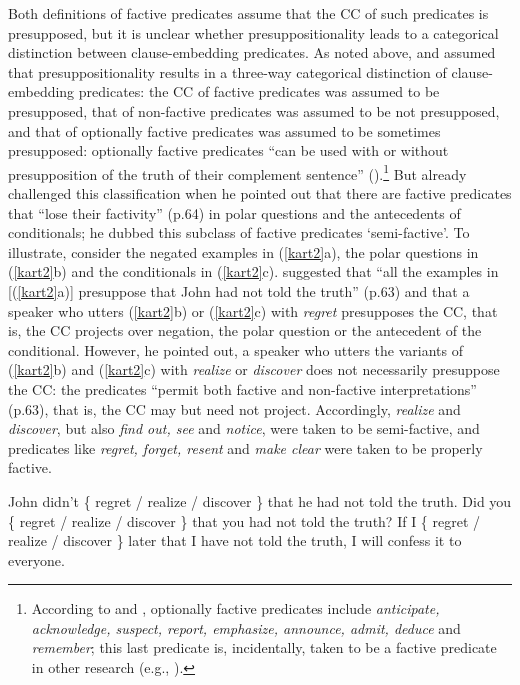 \documentclass[11pt,fleqn]{article}
\newcommand{\6}{\mbox{$[\hspace*{-.6mm}[$}}
\newcommand{\9}{\mbox{$]\hspace*{-.6mm}]$}}
\begin{document}
Both definitions of factive predicates assume that the CC of such predicates is presupposed, but it is unclear whether presuppositionality leads to a categorical distinction between clause-embedding predicates. As noted above, \citet{kiparsky-kiparsky70} and \citet{karttunen71-implicative} assumed that presuppositionality results in a three-way categorical distinction of clause-embedding predicates:  the CC of factive predicates was assumed to be presupposed, that of non-factive predicates was assumed to be not presupposed, and that of optionally factive predicates was assumed to be sometimes presupposed: optionally factive predicates ``can be used with or without presupposition of the truth of their complement sentence'' (\citealt[340]{karttunen71-implicative}).\footnote{According to \citet{kiparsky-kiparsky70} and \citet{karttunen71-implicative}, optionally factive predicates include {\em anticipate, acknowledge, suspect, report, emphasize, announce, admit, deduce} and {\em remember}; this last predicate is, incidentally, taken to be a factive predicate in other research (e.g., \citealt{simons07,abrusan2016,karttunen2016,aravind-hackl2017,cremers2018}).} But \citet{karttunen71b} already challenged this classification when he pointed out that there are factive predicates that ``lose their factivity'' (p.64) in polar questions and the antecedents of conditionals; he dubbed this subclass of factive predicates `semi-factive'. To illustrate, consider the negated examples in (\ref{kart2}a), the polar questions in (\ref{kart2}b) and the conditionals in (\ref{kart2}c). \citet{karttunen71b} suggested that ``all the examples in [(\ref{kart2}a)] presuppose that John had not told the truth'' (p.63) and that a speaker who utters (\ref{kart2}b) or (\ref{kart2}c) with {\em regret} presupposes the CC, that is, the CC projects over negation, the polar question or  the antecedent of the conditional. However, he pointed out, a speaker who utters the variants of (\ref{kart2}b) and (\ref{kart2}c) with {\em realize} or {\em discover} does not necessarily presuppose the CC: the predicates ``permit both factive and non-factive interpretations'' (p.63), that is, the CC may but need not project. Accordingly, {\em realize} and {\em discover}, but also {\em find out, see} and {\em notice}, were taken to be semi-factive, and predicates like {\em regret, forget, resent} and {\em make clear}  were taken to be properly factive.

\begin{exe}
\ex\label{kart2} \citealt[63f.]{karttunen71b}
\begin{xlist}
\ex John didn't \{ regret / realize / discover \} that he had not told the truth.
\ex  Did you \{ regret / realize / discover \} that you had not told the truth?
\ex  If I \{ regret / realize / discover \} later that I have not told the truth, I will confess it to everyone.
\end{xlist}
\end{exe}
\end{document}

